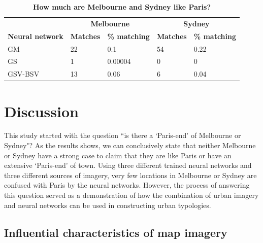 \documentclass[10pt,letterpaper,hidelinks]{article}
\begin{document}
\begin{table}[!htbp]
\caption{\bf How much are Melbourne and Sydney like Paris? \label{tab:melbournesydneyparis}}     
\begin{tabular}{ l  l l l  l}
 \hline    &  \multicolumn{2}{c}{\textbf{Melbourne}} & \multicolumn{2}{c}{\textbf{Sydney}}  \\  
\textbf{Neural network} & \textbf{Matches} & \textbf{\% matching}  & \textbf{Matches} & \textbf{\% matching}\\ \hline
GM & 22 & 0.1 & 54 & 0.22 \\ 
GS & 1 & 0.00004 & 0 & 0 \\ 
GSV-BSV & 13 & 0.06 & 6 & 0.04 \\ \hline
\end{tabular}
\end{table}

\section*{Discussion}\label{sec:discussion}
This study started with the question ``is there a `Paris-end' of Melbourne or Sydney"? As the results shows, we can conclusively state that neither Melbourne or Sydney have a strong case to claim that they are like Paris or have an extensive `Paris-end' of town. Using three different trained neural networks and three different sources of imagery, very few locations in Melbourne or Sydney are confused with Paris by the neural networks. However, the process of answering this question served as a demonstration of how the combination of urban imagery and neural networks can be used in constructing urban typologies.

\subsection*{Influential characteristics of map imagery}
\end{document}
